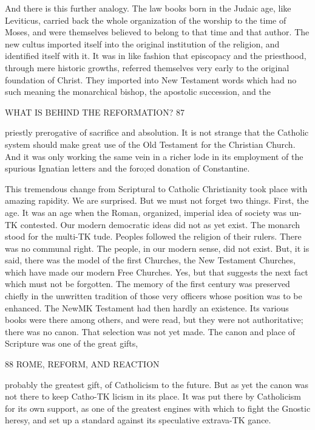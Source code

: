 \documentclass[12pt,a5paper,twoside]{book}
\begin{document}
And there is this further analogy. The law books 
born in the Judaic age, like Leviticus, carried back 
the whole organization of the worship to the time of 
Moses, and were themselves believed to belong to that 
time and that author. The new cultus imported 
itself into the original institution of the religion, and 
identified itself with it. It was in like fashion that 
episcopacy and the priesthood, through mere historic 
growths, referred themselves very early to the original 
foundation of Christ. They imported into New 
Testament words which had no such meaning the 
monarchical bishop, the apostolic succession, and the 



WHAT IS BEHIND THE REFORMATION? 87 

priestly prerogative of sacrifice and absolution. It is 
not strange that the Catholic system should make great 
use of the Old Testament for the Christian Church. 
And it was only working the same vein in a richer 
lode in its employment of the spurious Ignatian letters 
and the foro;ed donation of Constantine. 

This tremendous change from Scriptural to 
Catholic Christianity took place with amazing rapidity. 
We are surprised. But we must not forget two 
things. First, the age. It was an age when the 
Roman, organized, imperial idea of society was un-TK
contested. Our modern democratic ideas did not 
as yet exist. The monarch stood for the multi-TK
tude. Peoples followed the religion of their rulers. 
There was no communal right. The people, in our 
modern sense, did not exist. But, it is said, there was 
the model of the first Churches, the New Testament 
Churches, which have made our modern Free Churches. 
Yes, but that suggests the next fact which must not 
be forgotten. The memory of the first century was 
preserved chiefly in the unwritten tradition of those 
very officers whose position was to be enhanced. 
The NewMK Testament had then hardly an existence. 
Its various books were there among others, and were 
read, but they were not authoritative; there was 
no canon. That selection was not yet made. The 
canon and place of Scripture was one of the great gifts, 



88 ROME, REFORM, AND REACTION 

probably the greatest gift, of Catholicism to the future. 
But as yet the canon was not there to keep Catho-TK
licism in its place. It was put there by Catholicism 
for its own support, as one of the greatest 
engines with which to fight the Gnostic heresy, and 
set up a standard against its speculative extrava-TK
gance. 
\end{document}
